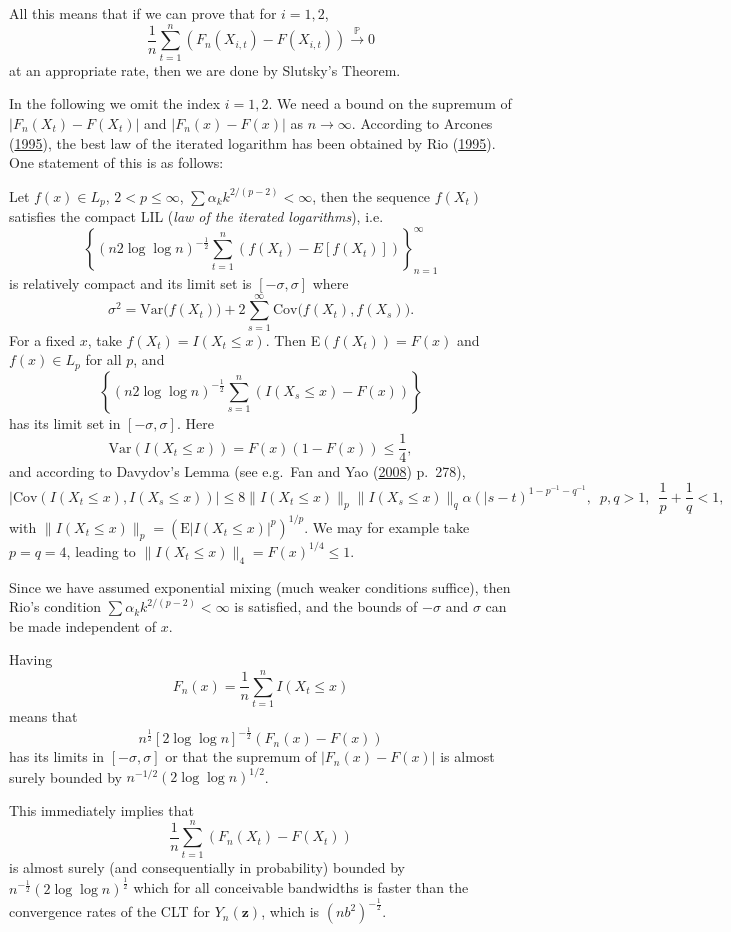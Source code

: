 \documentclass[
  12pt,
  letterpaper]{article}
\numberwithin{equation}{section}
\newcommand{\z}{\bm{z}}
\begin{document}
All this means that if we can prove that for \(i=1,2\),
\[\frac{1}{n}\sum_{t=1}^n(F_n(X_{i,t}) - F(X_{i,t})) \stackrel{\mathbb{P}}{\rightarrow} 0\]
at an appropriate rate, then we are done by Slutsky's Theorem.

In the following we omit the index \(i=1,2\). We need a bound on the supremum of \(|F_n(X_t) - F(X_t)|\) and \(|F_n(x) - F(x)|\) as \(n \rightarrow \infty\). According to Arcones (\protect\hyperlink{ref-arcones1995law}{1995}), the best law of the iterated logarithm has been obtained by Rio (\protect\hyperlink{ref-rio1995functional}{1995}). One statement of this is as follows:

Let \(f(x) \in L_p\), \(2<p\leq\infty\), \(\sum\alpha_k k^{2/(p-2)} < \infty\), then the sequence \(f(X_t)\) satisfies the compact LIL (\emph{law of the iterated logarithms}), i.e.
\[\left\{\left(n2\log\log n\right)^{-\frac{1}{2}} \sum_{t=1}^n(f(X_t) - E[f(X_t)]) \right\}_{n=1}^{\infty}\]
is relatively compact and its limit set is \([-\sigma, \sigma]\) where
\[\sigma^2 = \textrm{Var}\Big(f(X_t)\Big) + 2\sum_{s=1}^{\infty}\textrm{Cov}\Big(f(X_t), f(X_s)\Big).\]
For a fixed \(x\), take \(f(X_t) = I(X_t\leq x)\). Then E\((f(X_t)) = F(x)\) and \(f(x)\in L_p\) for all \(p\), and
\[\left\{\left(n2\log\log n\right)^{-\frac{1}{2}} \sum_{s=1}^n \left(I(X_s \leq x) - F(x) \right) \right\}\]
has its limit set in \([-\sigma, \sigma]\). Here
\[\textrm{Var}(I(X_t \leq x)) = F(x)(1-F(x)) \leq \frac{1}{4},\]
and according to Davydov's Lemma (see e.g.~Fan and Yao (\protect\hyperlink{ref-fan2008nonlinear}{2008}) p.~278),
\[\big| \textrm{Cov}(I(X_t \leq x), I(X_s \leq x))\big| \leq 8 \|I(X_t \leq x)\|_p \|I(X_s \leq x)\|_q \alpha(|s-t)^{1-p^{-1}-q^{-1}}, \,\,\, p,q>1, \,\,\, \frac{1}{p}+\frac{1}{q} < 1,\]
with \(\| I(X_t \leq x)\|_p = \left(\textrm{E}|I(X_t \leq x)|^p\right)^{1/p}\). We may for example take \(p=q=4\), leading to \(\| I(X_t \leq x) \|_4 = F(x)^{1/4} \leq 1\).

Since we have assumed exponential mixing (much weaker conditions suffice), then Rio's condition \(\sum \alpha_k k^{2/(p-2)} < \infty\) is satisfied, and the bounds of \(-\sigma\) and \(\sigma\) can be made independent of \(x\).

Having
\[F_n(x) = \frac{1}{n}\sum_{t=1}^n I(X_t \leq x)\]
means that
\[n^{\frac{1}{2}}[2\log \log n]^{-\frac{1}{2}} (F_n(x) - F(x))\]
has its limits in \([-\sigma, \sigma]\) or that the supremum of \(|F_n(x) - F(x)|\) is almost surely bounded by \(n^{-1/2}(2\log\log n)^{1/2}\).

This immediately implies that
\[\frac{1}{n}\sum_{t=1}^n\left(F_n(X_t) - F(X_t)\right)\]
is almost surely (and consequentially in probability) bounded by \(n^{-\frac{1}{2}}(2 \log \log n)^{\frac{1}{2}}\) which for all conceivable bandwidths is faster than the convergence rates of the CLT for \(Y_n(\z)\), which is \((nb^2)^{-\frac{1}{2}}\).
\end{document}
